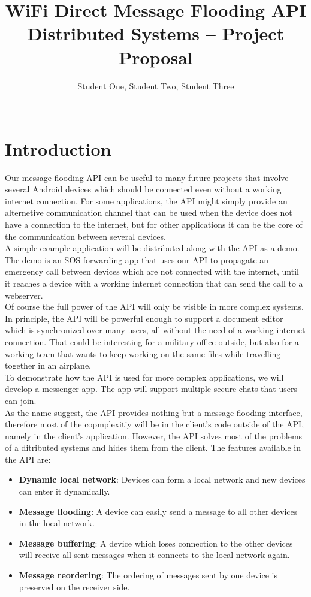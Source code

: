 \documentclass{report}
\title{WiFi Direct Message Flooding API \\
\normalsize{Distributed Systems -- Project Proposal}}
\author{
%
%
\alignauthor \normalsize{Student One,  Student Two, Student Three}\\
	\affaddr{\normalsize{ETH ID-1 XX-XXX-XXX, ETH ID-2 XX-XXX-XXX, ETH ID-3 XX-XXX-XXX}}\\
	\email{\normalsize{one@student.ethz.ch, two@student.ethz.ch, three@student.ethz.ch}}
}
\begin{document}
	
	\maketitle
	
	\begin{abstract}
		
	\end{abstract}
	\section{Introduction}
		Our message flooding API can be useful to many future projects that involve several Android devices which should be connected even without a working internet connection. For some applications, the API might simply provide an alternetive communication channel that can be used when the device does not have a connection to the internet, but for other applications it can be the core of the communication between several devices. \\
		A simple example application will be distributed along with the API as a demo. The demo is an SOS forwarding app that uses our API to propagate an emergency call between devices which are not connected with the internet, until it reaches a device with a working internet connection that can send the call to a webserver. \\
		Of course the full power of the API will only be visible in more complex systems. In principle, the API will be powerful enough to support a document editor which is synchronized over many users, all without the need of a working internet connection. That could be interesting for a military office outside, but also for a working team that wants to keep working on the same files while travelling together in an airplane. \\
		To demonstrate how the API is used for more complex applications, we will develop a messenger app. The app will support multiple secure chats that users can join. \\
		As the name suggest, the API provides nothing but a message flooding interface, therefore most of the copmplexitiy will be in the client's code outside of the API, namely in the client's application. However, the API solves most of the problems of a ditributed systems and hides them from the client. The features available in the API are:
		\begin{itemize}
        	\item {\bf Dynamic local network}: Devices can form a local network and new devices can enter it dynamically.
        	\item {\bf Message flooding}: A device can easily send a message to all other devices in the local network.
        	\item {\bf Message buffering}: A device which loses connection to the other devices will receive all sent messages when it connects to the local network again.
        	\item {\bf Message reordering}: The ordering of messages sent by one device is preserved on the receiver side.
		\end{itemize}
		
\end{document}
